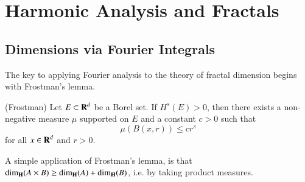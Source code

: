
\part{Harmonic Analysis and Fractals}

\chapter{Dimensions via Fourier Integrals}

The key to applying Fourier analysis to the theory of fractal dimension begins with Frostman's lemma.

\begin{lemma} (Frostman)
  Let $E \subset \operatorname{\mathbf{R}}^d$ be a Borel set. If $H^s(E) > 0$, then there exists a non-negative measure $\mu$ supported on $E$ and a constant $c > 0$ such that
  \[ \mu(B(x,r)) \leq c r^s \]
  for all $x \in \operatorname{\mathbf{R}}^d$ and $r > 0$.
\end{lemma}

A simple application of Frostman's lemma, is that $\operatorname{\dim_{\mathbf{H}}}(A \times B) \geq \operatorname{\dim_{\mathbf{H}}}(A) + \operatorname{\dim_{\mathbf{H}}}(B)$, i.e. by taking product measures.

